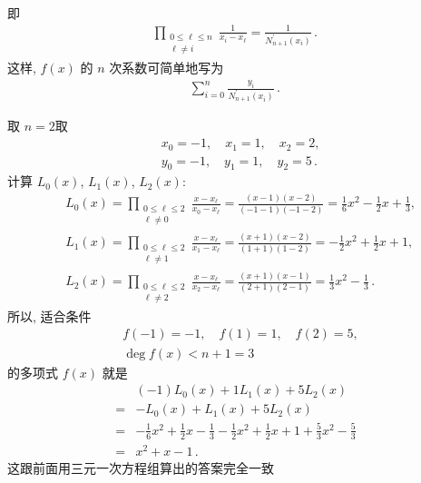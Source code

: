 \begin{remark}
\begin{align*}
    \end{align*}
    即
    \begin{align*}
        \prod_{\begin{smallmatrix}0 \leq \ell \leq n \\\ell \neq i\end{smallmatrix}} \frac{1}{x_i - x_\ell} = \frac{1}{N_{n+1}^{\prime} (x_i)} \period
    \end{align*}
    这样, $f(x)$ 的 $n$ 次系数可简单地写为
    \begin{align*}
        \sum_{i = 0}^{n} \frac{y_i}{N_{n+1}^{\prime} (x_i)} \period
    \end{align*}
\end{remark}

\begin{example}
    取 $n = 2$\period 取
    \begin{align*}
         & x_0 = -1, \quad x_1 = 1, \quad x_2 = 2,        \\
         & y_0 = -1, \quad y_1 = 1, \quad y_2 = 5 \period
    \end{align*}
    计算 $L_0 (x)$, $L_1 (x)$, $L_2 (x)$:
    \begin{align*}
         & L_0 (x) = \prod_{\begin{smallmatrix}0 \leq \ell \leq 2 \\\ell \neq 0\end{smallmatrix}} \frac{x - x_\ell}{x_0 - x_\ell} = \frac{(x - 1)(x - 2)}{(-1 - 1)(-1 - 2)} = \frac16 x^2 - \frac12 x + \frac13, \\
         & L_1 (x) = \prod_{\begin{smallmatrix}0 \leq \ell \leq 2 \\\ell \neq 1\end{smallmatrix}} \frac{x - x_\ell}{x_1 - x_\ell} = \frac{(x + 1)(x - 2)}{(1 + 1)(1 - 2)} = -\frac12 x^2 + \frac12 x + 1,        \\
         & L_2 (x) = \prod_{\begin{smallmatrix}0 \leq \ell \leq 2 \\\ell \neq 2\end{smallmatrix}} \frac{x - x_\ell}{x_2 - x_\ell} = \frac{(x + 1)(x - 1)}{(2 + 1)(2 - 1)} = \frac13 x^2 - \frac13 \period
    \end{align*}
    所以, 适合条件
    \begin{align*}
         & f(-1) = -1, \quad f(1) = 1, \quad f(2) = 5, \\
         & \deg f(x) < n + 1 = 3
    \end{align*}
    的多项式 $f(x)$ 就是
    \begin{align*}
             & (-1)L_0 (x) + 1L_1 (x) + 5L_2 (x)  \\
        = {} & -L_0 (x) + L_1 (x) + 5L_2 (x)      \\
        = {} & -\frac16 x^2 + \frac12 x - \frac13
        - \frac12 x^2 + \frac12 x + 1
        + \frac53 x^2 - \frac53                   \\
        = {} & x^2 + x - 1 \period
    \end{align*}
    这跟前面用三元一次方程组算出的答案完全一致\period
\end{example}

